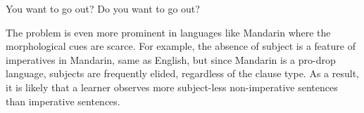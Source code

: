 \bxl
You want to go out?
\ex Do you want to go out?
\exl
\eex

The problem is even more prominent in languages like Mandarin where the morphological cues are scarce. For example, the absence of subject is a feature of imperatives in Mandarin, same as English, but since Mandarin is a pro-drop language, subjects are frequently elided, regardless of the clause type. As a result, it is likely that a learner observes more subject-less non-imperative sentences than imperative sentences.  



